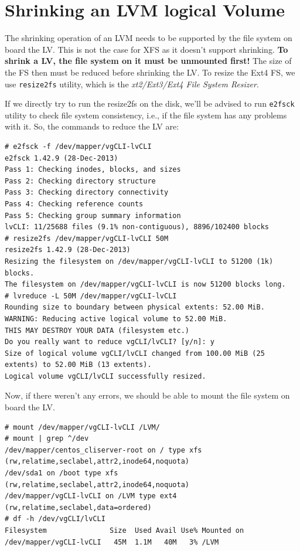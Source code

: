 \section{Shrinking an LVM logical Volume}
The shrinking operation of an LVM needs to be supported by the file system on board the LV. This is not the case for XFS as it doesn't support shrinking. \textbf{To shrink a LV, the file system on it must be unmounted first!} The size of the FS then must be reduced before shrinking the LV. To resize the Ext4 FS, we use \verb|resize2fs| utility, which is the \textit{xt2/Ext3/Ext4 File System Resizer}.

If we directly try to run the resize2fs on the disk, we'll be advised to run \verb|e2fsck| utility to check file system consistency, i.e., if the file system has any problems with it. So, the commands to reduce the LV are:

\vspace{-15pt}
\begin{verbatim}
# e2fsck -f /dev/mapper/vgCLI-lvCLI 
e2fsck 1.42.9 (28-Dec-2013)
Pass 1: Checking inodes, blocks, and sizes
Pass 2: Checking directory structure
Pass 3: Checking directory connectivity
Pass 4: Checking reference counts
Pass 5: Checking group summary information
lvCLI: 11/25688 files (9.1% non-contiguous), 8896/102400 blocks
# resize2fs /dev/mapper/vgCLI-lvCLI 50M
resize2fs 1.42.9 (28-Dec-2013)
Resizing the filesystem on /dev/mapper/vgCLI-lvCLI to 51200 (1k) blocks.
The filesystem on /dev/mapper/vgCLI-lvCLI is now 51200 blocks long.
# lvreduce -L 50M /dev/mapper/vgCLI-lvCLI 
Rounding size to boundary between physical extents: 52.00 MiB.
WARNING: Reducing active logical volume to 52.00 MiB.
THIS MAY DESTROY YOUR DATA (filesystem etc.)
Do you really want to reduce vgCLI/lvCLI? [y/n]: y
Size of logical volume vgCLI/lvCLI changed from 100.00 MiB (25 extents) to 52.00 MiB (13 extents).
Logical volume vgCLI/lvCLI successfully resized.
\end{verbatim}
\vspace{-10pt}

\noindent
Now, if there weren't any errors, we should be able to mount the file system on board the LV. 

\vspace{-15pt}
\begin{verbatim}
# mount /dev/mapper/vgCLI-lvCLI /LVM/
# mount | grep ^/dev
/dev/mapper/centos_cliserver-root on / type xfs (rw,relatime,seclabel,attr2,inode64,noquota)
/dev/sda1 on /boot type xfs (rw,relatime,seclabel,attr2,inode64,noquota)
/dev/mapper/vgCLI-lvCLI on /LVM type ext4 (rw,relatime,seclabel,data=ordered)
# df -h /dev/vgCLI/lvCLI 
Filesystem               Size  Used Avail Use% Mounted on
/dev/mapper/vgCLI-lvCLI   45M  1.1M   40M   3% /LVM
\end{verbatim}
\vspace{-10pt}

